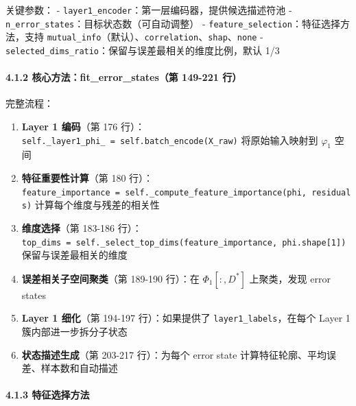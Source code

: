 \documentclass[
  12pt,
]{ctexart}
\providecommand{\tightlist}{%
  \setlength{\itemsep}{0pt}\setlength{\parskip}{0pt}}
\begin{document}
关键参数： - \texttt{layer1\_encoder}：第一层编码器，提供候选描述符池 -
\texttt{n\_error\_states}：目标状态数（可自动调整） -
\texttt{feature\_selection}：特征选择方法，支持
\texttt{mutual\_info}（默认）、\texttt{correlation}、\texttt{shap}、\texttt{none}
- \texttt{selected\_dims\_ratio}：保留与误差最相关的维度比例，默认 1/3

\paragraph{4.1.2 核心方法：fit\_error\_states（第 149-221
行）}\label{ux6838ux5fc3ux65b9ux6cd5fit_error_statesux7b2c-149-221-ux884c}

完整流程：

\begin{enumerate}
\def\labelenumi{\arabic{enumi}.}
\tightlist
\item
  \textbf{Layer 1 编码}（第 176
  行）：\texttt{self.\_layer1\_phi\_\ =\ self.batch\_encode(X\_raw)}
  将原始输入映射到 \(\varphi_1\) 空间
\item
  \textbf{特征重要性计算}（第 180
  行）：\texttt{feature\_importance\ =\ self.\_compute\_feature\_importance(phi,\ residuals)}
  计算每个维度与残差的相关性
\item
  \textbf{维度选择}（第 183-186
  行）：\texttt{top\_dims\ =\ self.\_select\_top\_dims(feature\_importance,\ phi.shape{[}1{]})}
  保留与误差最相关的维度
\item
  \textbf{误差相关子空间聚类}（第 189-190 行）：在 \(\Phi_1[:, D^*]\)
  上聚类，发现 error states
\item
  \textbf{Layer 1 细化}（第 194-197 行）：如果提供了
  \texttt{layer1\_labels}，在每个 Layer 1 簇内部进一步拆分子状态
\item
  \textbf{状态描述生成}（第 203-217 行）：为每个 error state
  计算特征轮廓、平均误差、样本数和自动描述
\end{enumerate}

\paragraph{4.1.3
特征选择方法}\label{ux7279ux5f81ux9009ux62e9ux65b9ux6cd5}
\end{document}
